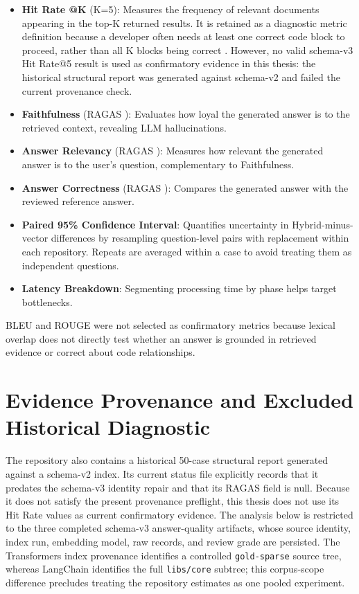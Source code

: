 \documentclass[12pt,letterpaper,oneside]{report}
\begin{document}
\begin{itemize}
    \item \textbf{Hit Rate @K} (K=5): Measures the frequency of relevant documents appearing in the top-K returned results. It is retained as a diagnostic metric definition because a developer often needs at least one correct code block to proceed, rather than all K blocks being correct \cite{thakur2021beir}. However, no valid schema-v3 Hit Rate@5 result is used as confirmatory evidence in this thesis: the historical structural report was generated against schema-v2 and failed the current provenance check.
    \item \textbf{Faithfulness} (RAGAS \cite{shahul2023ragas}): Evaluates how loyal the generated answer is to the retrieved context, revealing LLM hallucinations.
    \item \textbf{Answer Relevancy} (RAGAS \cite{shahul2023ragas}): Measures how relevant the generated answer is to the user's question, complementary to Faithfulness.
    \item \textbf{Answer Correctness} (RAGAS \cite{shahul2023ragas}): Compares the generated answer with the reviewed reference answer.
    \item \textbf{Paired 95\% Confidence Interval}: Quantifies uncertainty in Hybrid-minus-vector differences by resampling question-level pairs with replacement within each repository. Repeats are averaged within a case to avoid treating them as independent questions.
    \item \textbf{Latency Breakdown}: Segmenting processing time by phase helps target bottlenecks.
\end{itemize}

BLEU and ROUGE were not selected as confirmatory metrics because lexical overlap does not directly test whether an answer is grounded in retrieved evidence or correct about code relationships.

\section{Evidence Provenance and Excluded Historical Diagnostic}
The repository also contains a historical 50-case structural report generated against a schema-v2 index. Its current status file explicitly records that it predates the schema-v3 identity repair and that its RAGAS field is null. Because it does not satisfy the present provenance preflight, this thesis does not use its Hit Rate values as current confirmatory evidence. The analysis below is restricted to the three completed schema-v3 answer-quality artifacts, whose source identity, index run, embedding model, raw records, and review grade are persisted. The Transformers index provenance identifies a controlled \texttt{gold-sparse} source tree, whereas LangChain identifies the full \texttt{libs/core} subtree; this corpus-scope difference precludes treating the repository estimates as one pooled experiment.
\end{document}
